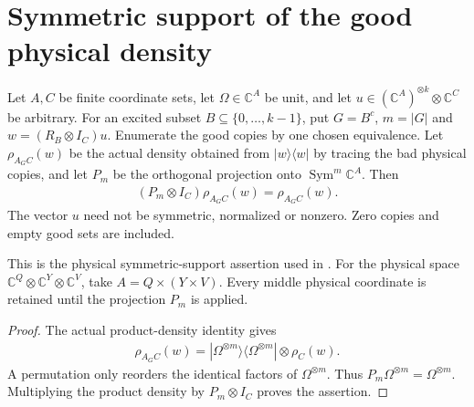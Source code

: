 \section{Symmetric support of the good physical density}
\label{sec:replica_good_physical_support}

\begin{theorem}
\label{thm:replica_good_physical_support}
\leanok
{}
Let $A,C$ be finite coordinate sets, let $\Omega\in\mathbb C^A$ be unit,
and let $u\in(\mathbb C^A)^{\otimes k}\otimes\mathbb C^C$ be arbitrary. For an excited subset
$B\subseteq\{0,\ldots,k-1\}$, put $G=B^c$, $m=|G|$ and
$w=(R_B\otimes I_C)u$. Enumerate the good copies by one chosen equivalence.
Let $\rho_{A_G C}(w)$ be the actual density obtained from
$|w\rangle\langle w|$ by tracing the bad physical copies, and let $P_m$
be the orthogonal projection onto $\operatorname{Sym}^m\mathbb C^A$.
Then
\begin{align}
 (P_m\otimes I_C)\rho_{A_G C}(w)=\rho_{A_G C}(w).
\end{align}
The vector $u$ need not be symmetric, normalized or nonzero. Zero copies
and empty good sets are included.

This is the physical symmetric-support assertion used in
\cite[Section~7]{OpenAI2026AreaLaw}. For the physical space
$\mathbb C^Q\otimes\mathbb C^Y\otimes\mathbb C^V$, take
$A=Q\times(Y\times V)$. Every middle physical coordinate is retained
until the projection $P_m$ is applied.
\end{theorem}
\begin{proof}
\leanok
The actual product-density identity gives
\begin{align}
 \rho_{A_G C}(w)
   =|\Omega^{\otimes m}\rangle\langle\Omega^{\otimes m}|
      \otimes\rho_C(w).
\end{align}
A permutation only reorders the identical factors of $\Omega^{\otimes m}$.
Thus $P_m\Omega^{\otimes m}=\Omega^{\otimes m}$. Multiplying the product
density by $P_m\otimes I_C$ proves the assertion.
\end{proof}
